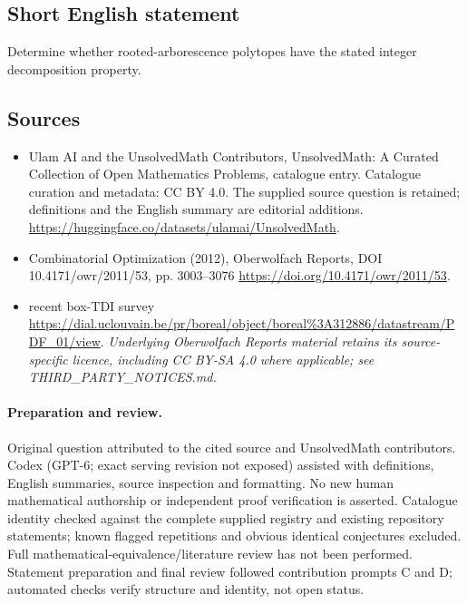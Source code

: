 \documentclass[11pt]{article}
\begin{document}
\subsection{Short English statement}
Determine whether rooted-arborescence polytopes have the stated integer decomposition property.
\subsection{Sources}
\begin{itemize}
\item[\hypertarget{source:statement:1}{S1}] Ulam AI and the UnsolvedMath Contributors, UnsolvedMath: A Curated Collection of Open Mathematics Problems, catalogue entry. Catalogue curation and metadata: CC BY 4.0. The supplied source question is retained; definitions and the English summary are editorial additions.
\url{https://huggingface.co/datasets/ulamai/UnsolvedMath}.
\item[\hypertarget{source:statement:2}{S2}] Combinatorial Optimization (2012), Oberwolfach Reports, DOI 10.4171/owr/2011/53, pp. 3003--3076
\url{https://doi.org/10.4171/owr/2011/53}.
\item[\hypertarget{source:statement:3}{S3}] recent box-TDI survey
\url{https://dial.uclouvain.be/pr/boreal/object/boreal%3A312886/datastream/PDF_01/view}.
\textit{Underlying Oberwolfach Reports material retains its source-specific licence, including CC BY-SA 4.0 where applicable; see THIRD\_PARTY\_NOTICES.md.}
\end{itemize}
\paragraph{Preparation and review.}
Original question attributed to the cited source and UnsolvedMath contributors. Codex (GPT-6; exact serving revision not exposed) assisted with definitions, English summaries, source inspection and formatting. No new human mathematical authorship or independent proof verification is asserted. Catalogue identity checked against the complete supplied registry and existing repository statements; known flagged repetitions and obvious identical conjectures excluded. Full mathematical-equivalence/literature review has not been performed. Statement preparation and final review followed contribution prompts C and D; automated checks verify structure and identity, not open status.
\label{end:statement}
\end{document}
